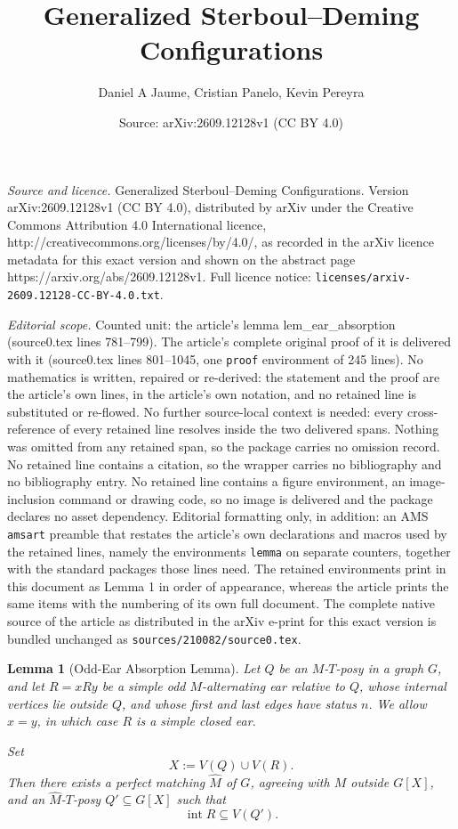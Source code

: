 \documentclass[10pt,a4paper]{amsart}
\title{Generalized Sterboul--Deming Configurations}
\author{Daniel A Jaume, Cristian Panelo, Kevin Pereyra}
\date{Source: arXiv:2609.12128v1 (CC BY 4.0)}
\newtheorem{lemma}{Lemma}
\begin{document}
\maketitle

\noindent\emph{Source and licence.} Generalized Sterboul--Deming Configurations. Version arXiv:2609.12128v1 (CC BY 4.0), distributed by arXiv under the Creative Commons Attribution 4.0 International licence, http://creativecommons.org/licenses/by/4.0/, as recorded in the arXiv licence metadata for this exact version and shown on the abstract page https://arxiv.org/abs/2609.12128v1. Full licence notice: \texttt{licenses/arxiv-2609.12128-CC-BY-4.0.txt}.\par\smallskip

\noindent\textit{Editorial scope.} Counted unit: the article's lemma lem\_ear\_absorption (source0.tex lines 781--799). The article's complete original proof of it is delivered with it (source0.tex lines 801--1045, one \texttt{proof} environment of 245 lines). No mathematics is written, repaired or re-derived: the statement and the proof are the article's own lines, in the article's own notation, and no retained line is substituted or re-flowed.  No further source-local context is needed: every cross-reference of every retained line resolves inside the two delivered spans.  Nothing was omitted from any retained span, so the package carries no omission record.  No retained line contains a citation, so the wrapper carries no bibliography and no bibliography entry.  No retained line contains a figure environment, an image-inclusion command or drawing code, so no image is delivered and the package declares no asset dependency.  Editorial formatting only, in addition: an AMS \texttt{amsart} preamble that restates the article's own declarations and macros used by the retained lines, namely the environments \texttt{lemma} on separate counters, together with the standard packages those lines need.  The retained environments print in this document as Lemma 1 in order of appearance, whereas the article prints the same items with the numbering of its own full document.  The complete native source of the article as distributed in the arXiv e-print for this exact version is bundled unchanged as \texttt{sources/210082/source0.tex}.
\begin{lemma}[Odd-Ear Absorption Lemma]
\label{lem_ear_absorption}
Let \(Q\) be an \(M\)-\(T\)-posy in a graph \(G\), and let
\(R=xRy\) be a simple odd \(M\)-alternating ear relative to \(Q\),
whose internal vertices lie outside \(Q\), and whose first and last
edges have status \(n\). We allow \(x=y\), in which case \(R\) is a
simple closed ear.

Set
\[
X:=V(Q)\cup V(R).
\]
Then there exists a perfect matching \(\widehat M\) of \(G\), agreeing
with \(M\) outside \(G[X]\), and an \(\widehat M\)-\(T\)-posy
\(Q'\subseteq G[X]\) such that
\[
\operatorname{int}R\subseteq V(Q').
\]
\end{lemma}
\end{document}
